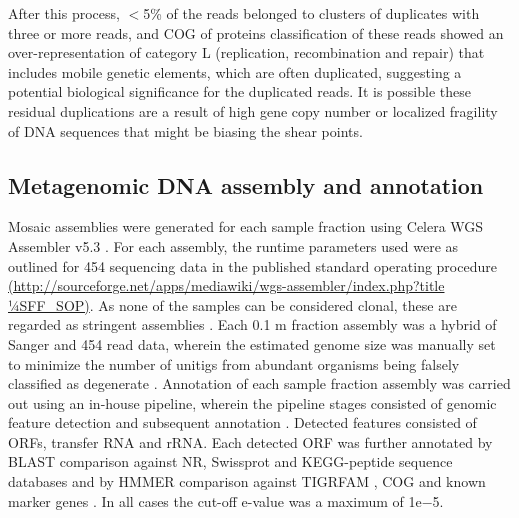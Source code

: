 After this process, $<$5\% of the reads belonged to clusters of duplicates with three or more reads, and \ac{COG} of proteins classification of these reads showed an over-representation of category L (replication, recombination and repair) that includes mobile genetic elements, which are often duplicated, suggesting a potential biological significance for the duplicated reads. 
It is possible these residual duplications are a result of high gene copy number or localized fragility of DNA sequences that might be biasing the shear points.

\subsection{Metagenomic DNA assembly and annotation}
Mosaic assemblies were generated for each sample fraction using Celera \ac{WGS} Assembler v5.3 \cite{Myers2000}. 
For each assembly, the runtime parameters used were as outlined for 454 sequencing data in the published standard operating procedure\\ 
\url{(http://sourceforge.net/apps/mediawiki/wgs-assembler/index.php?title 1⁄4SFF\_SOP)}. 
As none of the samples can be considered clonal, these are regarded as stringent assemblies \cite{Rusch2007}. 
Each 0.1 \textmu{}m fraction assembly was a hybrid of Sanger and 454 read data, wherein the estimated genome size was manually set to minimize the number of unitigs from abundant organisms being falsely classified as degenerate \cite{Rusch2007}. 
Annotation of each sample fraction assembly was carried out using an in-house pipeline, wherein the pipeline stages consisted of genomic feature detection and subsequent annotation \cite{DeMaere2011}. 
Detected features consisted of \acp{ORF}, transfer \textsc{RNA} and \ac{rRNA}. 
Each detected \ac{ORF} was further annotated by \ac{BLAST} comparison against \ac{NR}, Swissprot and \ac{KEGG}-peptide sequence databases and by \ac{HMMER} comparison against \ac{TIGRFAM} \cite{Haft2001}, \ac{COG} \cite{Tatusov1997, Tatusov2003} and known marker genes \cite{vonMering2007}.
In all cases the cut-off e-value was a maximum of 1e$-$5. 


